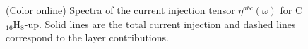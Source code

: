 \documentclass[pss]{wiley2sp} %
\begin{document}
\begin{figure}[b]
\centering
{}\\
\\
\caption{(Color online) Spectra of the current injection tensor
{$\eta^{abc}(\omega)$} for C$_{16}$H$_{8}$-up. Solid lines are the total
current injection and dashed lines correspond to the layer
contributions.\label{fig:up-eta}}
\end{figure}
\end{document}
